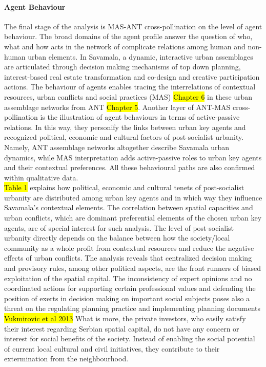 \documentclass[11pt]{report}
\begin{document}
\paragraph{Agent Behaviour}
The final stage of the analysis is MAS-ANT cross-pollination on the level of agent behaviour.
The broad  domains  of  the  agent  profile  answer  the  question  of  who,  what  and  how  acts  in  the  network  of complicate relations among human and non-human urban elements.
In Savamala, a dynamic, interactive urban assemblages are articulated through decision making mechanisms of top down planning, interest-based real estate transformation and co-design and creative participation actions.
The behaviour of agents enables tracing the interrelations of contextual resources, urban conflicts and social practices (MAS) \hl{Chapter 6} in these urban assemblage networks from ANT \hl{Chapter 5}.
Another layer of ANT-MAS cross-pollination is the illustration of agent behaviours in terms of active-passive relations.
In this way, they personify the links between urban key agents and recognized political, economic and cultural factors of post-socialist urbanity. 
Namely, ANT assemblage networks altogether describe Savamala urban dynamics, while MAS interpretation adds active-passive roles to urban key agents and their contextual preferences. 
All these behavioural paths are also confirmed within qualitative data.
\\
\hl{Table 1} explains how political, economic and cultural tenets of post-socialist urbanity are distributed among urban key agents and in which way they influence Savamala's contextual elements.
The correlation between spatial capacities and urban conflicts, which are dominant preferential elements of the chosen urban key agents, are of special interest for such analysis.
The level of post-socialist urbanity directly depends on the balance between how the society/local community as a whole profit from contextual resources and reduce the negative effects of urban conflicts.
The analysis reveals that centralized decision making and provisory rules, among other political aspects, are the front runners of biased exploitation of the spatial capital.
The inconsistency of expert opinions and no coordinated actions for supporting certain professional values and defending the position of exerts in decision making on important social subjects poses also a threat on the regulating planning practice and implementing planning  documents \hl{Vukmirovic et al 2013}
What is more, the private investors, who easily satisfy their interest regarding Serbian spatial capital, do not have any concern or interest for social benefits of the society. Instead of enabling the social potential of current local cultural and civil initiatives, they contribute to their extermination from the neighbourhood.
\end{document}
